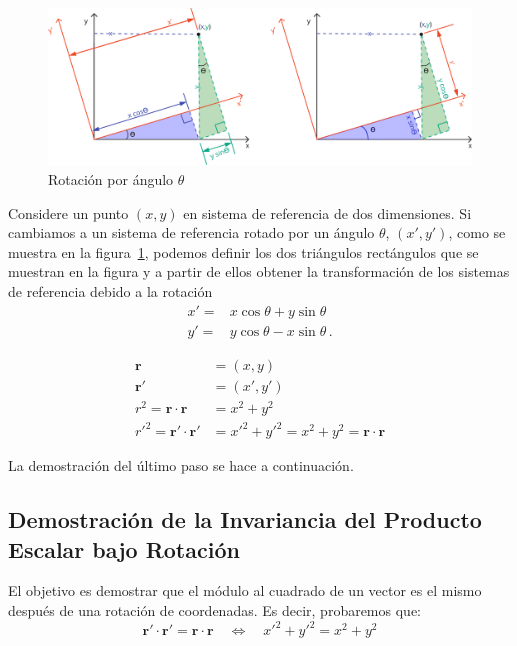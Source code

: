 \documentclass[11pt,a4paper]{article}
\begin{document}
\begin{figure}
  \centering
  \includegraphics[scale=0.75]{so2}
  \caption{Rotación por ángulo $\theta$}
  \label{fig:so2}
\end{figure}



Considere un punto $(x,y)$ en sistema de referencia de dos dimensiones. Si cambiamos a un sistema de referencia rotado por un ángulo $\theta$, $(x',y')$, como se muestra en la figura~\ref{fig:so2}, podemos definir los dos triángulos rectángulos que se muestran en la figura y a partir de ellos obtener la transformación de los sistemas de referencia debido a la rotación
\begin{align}
  x'=&x\cos\theta+y\sin\theta \nonumber\\
  y'=&y\cos\theta-x\sin\theta\,.
\end{align}


\begin{align*}
    \boldsymbol{r} &= (x, y) \\
    \boldsymbol{r}' &= (x', y') \\[1em] %
    r^2 = \boldsymbol{r} \cdot \boldsymbol{r} &= x^2 + y^2 \\
  {r'}^2 =  \boldsymbol{r}' \cdot \boldsymbol{r}' &= x'^2 + y'^2 = x^2 + y^2 = \boldsymbol{r} \cdot \boldsymbol{r}
\end{align*}

La demostración del último paso se hace a continuación.


\subsection*{Demostración de la Invariancia del Producto Escalar bajo Rotación}

El objetivo es demostrar que el módulo al cuadrado de un vector es el mismo después de una rotación de coordenadas. Es decir, probaremos que:
\[
\boldsymbol{r}' \cdot \boldsymbol{r}' = \boldsymbol{r} \cdot \boldsymbol{r} \quad \Leftrightarrow \quad x'^2 + y'^2 = x^2 + y^2
\]
\end{document}
